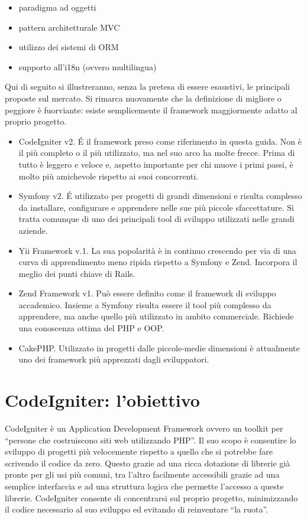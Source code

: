 \begin{itemize}
\item paradigma ad oggetti
\item pattern architetturale \ac{MVC}
\item utilizzo dei sistemi di \ac{ORM}
\item supporto all'i18n (ovvero multilingua)
\end{itemize}

Qui di seguito si illustreranno, senza la pretesa di essere esaustivi, le principali proposte sul mercato. Si rimarca nuovamente che la definizione di migliore o peggiore è fuorviante: esiste semplicemente il framework maggiormente adatto al proprio progetto.

\begin{itemize}
\item CodeIgniter v2. \'E il framework preso come riferimento in questa guida. Non è il più completo o il più utilizzato, ma nel suo arco ha molte frecce. Prima di tutto è leggero e veloce e, aspetto importante per chi muove i primi passi, è molto più amichevole rispetto ai suoi concorrenti. 
\item Symfony v2. \'E utilizzato per progetti di grandi dimensioni e risulta complesso da installare, configurare e apprendere nelle sue più piccole sfaccettature. Si tratta comunque di uno dei principali tool di sviluppo utilizzati nelle grandi aziende.
\item Yii Framework v.1. La sua popolarità è in continuo crescendo per via di una curva di apprendimento meno ripida rispetto a Symfony e Zend. Incorpora il meglio dei punti chiave di Rails.
\item Zend Framework v1. Può essere definito come il framework di sviluppo accademico. Insieme a Symfony risulta essere il tool più complesso da apprendere, ma anche quello più utilizzato in ambito commerciale. Richiede una conoscenza ottima del \ac{PHP} e \ac{OOP}. 
\item CakePHP. Utilizzato in progetti dalle piccole-medie dimensioni è attualmente uno dei framework più apprezzati dagli sviluppatori.
\end{itemize}

\section*{CodeIgniter: l'obiettivo}
CodeIgniter è un Application Development Framework ovvero un toolkit per ``persone che costruiscono siti web utilizzando \ac{PHP}''. Il suo scopo è consentire lo sviluppo di progetti più velocemente rispetto a quello che si potrebbe fare scrivendo il codice da zero. Questo grazie ad una ricca dotazione di librerie già pronte per gli usi più comuni, tra l'altro facilmente accessibili grazie ad una semplice interfaccia e ad una struttura logica che permette l'accesso a queste librerie. CodeIgniter consente di concentrarsi sul proprio progetto, minimizzando il codice necessario al suo sviluppo ed evitando di reinventare ``la ruota''.

